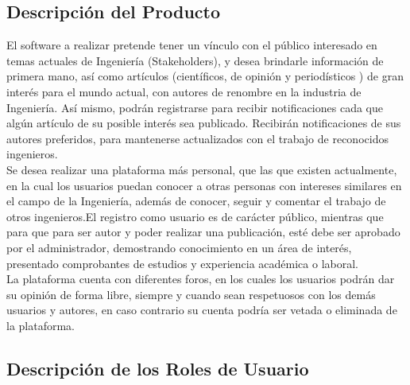 \documentclass[a4paper,12 pt]{article}
\begin{document}
\subsection{Descripción del Producto}

El software a realizar pretende tener un vínculo con el público interesado en
temas actuales de Ingeniería (Stakeholders), y desea brindarle información de
primera mano, así como artículos (científicos, de opinión y periodísticos ) de
gran interés para el mundo actual, con autores de renombre en la industria de
Ingeniería. Así mismo, podrán registrarse para recibir notificaciones cada que
algún artículo de su posible interés sea publicado. Recibirán notificaciones de
sus autores preferidos, para mantenerse actualizados con el trabajo de
reconocidos ingenieros.\\

Se desea realizar una plataforma más personal, que las que existen actualmente,
en la cual los usuarios puedan conocer a otras personas con intereses similares
en el campo de la Ingeniería, además de conocer, seguir y comentar el trabajo de
otros ingenieros.El registro como usuario es de carácter público, mientras que
para que para ser autor y poder realizar una publicación, esté debe ser aprobado
por el administrador, demostrando conocimiento en un área de interés, presentado
comprobantes de estudios y experiencia académica o laboral.\\

La plataforma cuenta con diferentes foros, en los cuales los usuarios podrán dar
su opinión de forma libre, siempre y cuando sean respetuosos con los demás
usuarios y autores, en caso contrario su cuenta podría ser vetada o eliminada de
la plataforma.

\subsection{Descripción de los Roles de Usuario}
\end{document}
